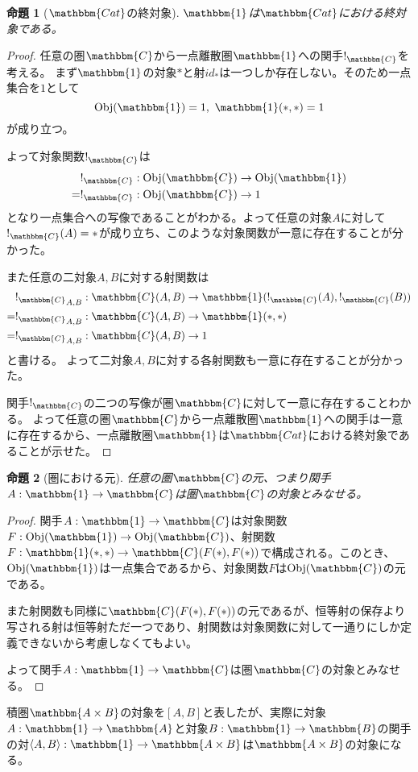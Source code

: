 \documentclass[dvipdfmx]{jsarticle}
\newcommand{\cat}[1]{\mathbbm{#1}}
\newcommand{\arrow}{\rightarrow}
\newcommand{\functor}[3]{#1:\cat{#2}\arrow \cat{#3}}
\newcommand{\tuple}[1]{\langle #1\rangle}
\newcommand{\obj}[1]{\mathrm{Obj}(\cat{#1})}
\newcommand{\mor}[3]{#1:#2\arrow #3}
\newcommand{\arset}[3]{\cat{#1}(#2,#3)}
\newcommand{\pcobj}[1]{[#1]}
\newtheorem{proof}{証明}[section]
\newtheorem{prop}{命題}[section]
\numberwithin{proof}{subsection}
\numberwithin{prop}{subsection}
\numberwithin{define}{subsection}
\begin{document}
	\begin{prop}[$\cat{Cat}$の終対象]
		$\cat{1}$は$\cat{Cat}$における終対象である。
	\end{prop}
	\begin{proof}
		任意の圏$\cat{C}$から一点離散圏$\cat{1}$への関手$!_{\cat{C}}$を考える。
		まず$\cat{1}$の対象$*$と射$id_*$は一つしか存在しない。そのため一点集合を$1$として
		\[\obj{1}=1,\ \arset{1}{*}{*}=1\]が成り立つ。

		よって対象関数$!_{\cat{C}}$は
		\begin{align*}
			&\mor{!_{\cat{C}}}{\obj{C}}{\obj{1}}\\
			=&\mor{!_{\cat{C}}}{\obj{C}}{1}
		\end{align*}
		となり一点集合への写像であることがわかる。よって任意の対象$A$に対して$!_{\cat{C}}(A)=*$が成り立ち、このような対象関数が一意に存在することが分かった。

		また任意の二対象$A,B$に対する射関数は
		\begin{align*}
			&\mor{{!_{\cat{C}}}_{A,B}}{\arset{C}{A}{B}}{\arset{1}{!_{\cat{C}}(A)}{!_{\cat{C}}(B)}}\\
			=&\mor{{!_{\cat{C}}}_{A,B}}{\arset{C}{A}{B}}{\arset{1}{*}{*}}\\
			=&\mor{{!_{\cat{C}}}_{A,B}}{\arset{C}{A}{B}}{1}\\
		\end{align*}と書ける。
		よって二対象$A,B$に対する各射関数も一意に存在することが分かった。

		関手$!_{\cat{C}}$の二つの写像が圏$\cat{C}$に対して一意に存在することわかる。
		よって任意の圏$\cat{C}$から一点離散圏$\cat{1}$への関手は一意に存在するから、一点離散圏$\cat{1}$は$\cat{Cat}$における終対象であることが示せた。
	\end{proof}
	\begin{prop}[圏における元]
		任意の圏$\cat{C}$の元、つまり関手$\functor{A}{1}{C}$は圏$\cat{C}$の対象とみなせる。
	\end{prop}
	\begin{proof}
		関手$\functor{A}{1}{C}$は対象関数$\mor{F}{\obj{1}}{\obj{C}}$、射関数$\mor{F}{\arset{1}{*}{*}}{\arset{C}{F(*)}{F(*)}}$で構成される。このとき、$\obj{1}$は一点集合であるから、対象関数$F$は$\obj{C}$の元である。

		また射関数も同様に$\arset{C}{F(*)}{F(*)}$の元であるが、恒等射の保存より写される射は恒等射ただ一つであり、射関数は対象関数に対して一通りにしか定義できないから考慮しなくてもよい。

		よって関手$\functor{A}{1}{C}$は圏$\cat{C}$の対象とみなせる。
	\end{proof}
	積圏$\cat{A\times B}$の対象を$\pcobj{A,B}$と表したが、実際に対象$\functor{A}{1}{A}$と対象$\functor{B}{1}{B}$の関手の対$\functor{\tuple{A,B}}{1}{A\times B}$は$\cat{A\times B}$の対象になる。
\end{document}
